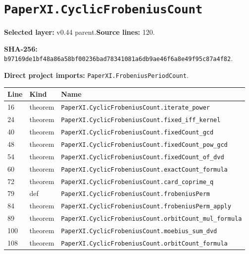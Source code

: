 \documentclass[10pt,oneside]{book}
\begin{document}
\section{\texorpdfstring{\nolinkurl{PaperXI.CyclicFrobeniusCount}}{PaperXI.CyclicFrobeniusCount}}\label{module:PaperXI.CyclicFrobeniusCount}

\textbf{Selected layer:} v0.44 parent.\quad\textbf{Source lines:} 120.\par\textbf{SHA-256:} {\scriptsize\nolinkurl{b97169de1bf48a86a58bf00236bad78341081a6db9ae46f6a8e49f95c87a4f82}}.


\textbf{Direct project imports:} \nolinkurl{PaperXI.FrobeniusPeriodCount}.

\begin{longtable}{@{}p{}p{}p{}@{}}\toprule Line&Kind&Name\\\midrule\endhead

16&theorem&\nolinkurl{PaperXI.CyclicFrobeniusCount.iterate_power}\\

24&theorem&\nolinkurl{PaperXI.CyclicFrobeniusCount.fixed_iff_kernel}\\

40&theorem&\nolinkurl{PaperXI.CyclicFrobeniusCount.fixedCount_gcd}\\

48&theorem&\nolinkurl{PaperXI.CyclicFrobeniusCount.fixedCount_pow_gcd}\\

54&theorem&\nolinkurl{PaperXI.CyclicFrobeniusCount.fixedCount_of_dvd}\\

60&theorem&\nolinkurl{PaperXI.CyclicFrobeniusCount.exactCount_formula}\\

72&theorem&\nolinkurl{PaperXI.CyclicFrobeniusCount.card_coprime_q}\\

79&def&\nolinkurl{PaperXI.CyclicFrobeniusCount.frobeniusPerm}\\

84&theorem&\nolinkurl{PaperXI.CyclicFrobeniusCount.frobeniusPerm_apply}\\

89&theorem&\nolinkurl{PaperXI.CyclicFrobeniusCount.orbitCount_mul_formula}\\

100&theorem&\nolinkurl{PaperXI.CyclicFrobeniusCount.moebius_sum_dvd}\\

108&theorem&\nolinkurl{PaperXI.CyclicFrobeniusCount.orbitCount_formula}\\

\bottomrule\end{longtable}
\end{document}
